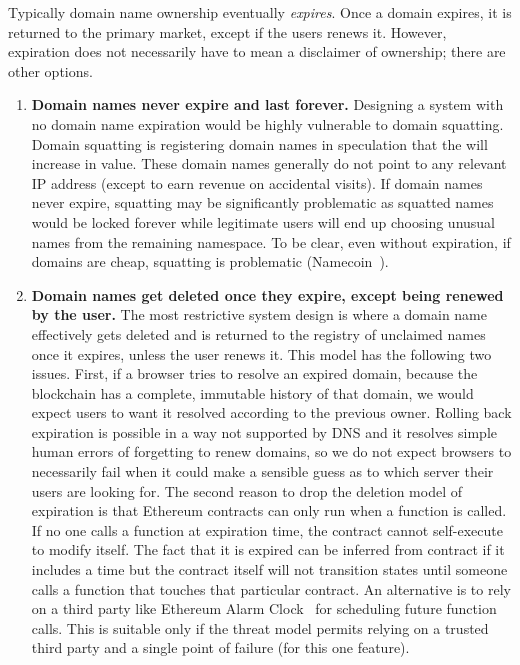 Typically domain name ownership eventually \textit{expires}. Once a domain expires, it is returned to the primary market, except if the users renews it. However, expiration does not necessarily have to mean a disclaimer of ownership; there are other options. 
\begin{enumerate}

\item \textbf{Domain names never expire and last forever.} Designing a system with no domain name expiration would be highly vulnerable to domain squatting. Domain squatting is registering domain names in speculation that the will increase in value. These domain names generally do not point to any relevant IP address (except to earn revenue on accidental visits). If domain names never expire, squatting may be significantly problematic as squatted names would be locked forever while legitimate users will end up choosing unusual names from the remaining namespace. To be clear, even without expiration, if domains are cheap, squatting is problematic (\eg Namecoin~\cite{Kalodner2015empirical}). 

\item \textbf{Domain names get deleted once they expire, except being renewed by the user.} The most restrictive system design is where a domain name effectively gets deleted and is returned to the registry of unclaimed names once it expires, unless the user renews it. This model has the following two issues. First, if a browser tries to resolve an expired domain, because the blockchain has a complete, immutable history of that domain, we would expect users to want it resolved according to the previous owner. Rolling back expiration is possible in a way not supported by DNS and it resolves simple human errors of forgetting to renew domains, so we do not expect browsers to necessarily fail when it could make a sensible guess as to which server their users are looking for. The second reason to drop the deletion model of expiration is that Ethereum contracts can only run when a function is called. If no one calls a function at expiration time, the contract cannot self-execute to modify itself. The fact that it is expired can be inferred from contract if it includes a time but the contract itself will not transition states until someone calls a function that touches that particular contract. An alternative is to rely on a third party like Ethereum Alarm Clock~\cite{Home41:online} for scheduling future function calls. This is suitable only if the threat model permits relying on a trusted third party and a single point of failure (for this one feature). 


\end{enumerate}
